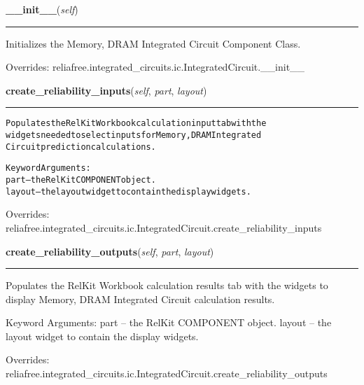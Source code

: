 \hspace{.8\funcindent}\begin{boxedminipage}{\funcwidth}

    \raggedright \textbf{\_\_init\_\_}(\textit{self})

    \vspace{-1.5ex}

    \rule{\textwidth}{0.5\fboxrule}
\setlength{\parskip}{2ex}
    Initializes the Memory, DRAM Integrated Circuit Component Class.

\setlength{\parskip}{1ex}
      Overrides: reliafree.integrated\_circuits.ic.IntegratedCircuit.\_\_init\_\_

    \end{boxedminipage}

    \vspace{0.5ex}

\hspace{.8\funcindent}\begin{boxedminipage}{\funcwidth}

    \raggedright \textbf{create\_reliability\_inputs}(\textit{self}, \textit{part}, \textit{layout})

    \vspace{-1.5ex}

    \rule{\textwidth}{0.5\fboxrule}
\setlength{\parskip}{2ex}
\begin{alltt}
Populates the RelKit Workbook calculation input tab with the
widgets needed to select inputs for Memory, DRAM Integrated
Circuit prediction calculations.

Keyword Arguments:
  part -- the RelKit COMPONENT object.
layout -- the layout widget to contain the display widgets.
\end{alltt}

\setlength{\parskip}{1ex}
      Overrides: reliafree.integrated\_circuits.ic.IntegratedCircuit.create\_reliability\_inputs

    \end{boxedminipage}

    \vspace{0.5ex}

\hspace{.8\funcindent}\begin{boxedminipage}{\funcwidth}

    \raggedright \textbf{create\_reliability\_outputs}(\textit{self}, \textit{part}, \textit{layout})

    \vspace{-1.5ex}

    \rule{\textwidth}{0.5\fboxrule}
\setlength{\parskip}{2ex}
    Populates the RelKit Workbook calculation results tab with the 
    widgets to display Memory, DRAM Integrated Circuit calculation results.

    Keyword Arguments: part   -- the RelKit COMPONENT object. layout -- 
    the layout widget to contain the display widgets.

\setlength{\parskip}{1ex}
      Overrides: reliafree.integrated\_circuits.ic.IntegratedCircuit.create\_reliability\_outputs

    \end{boxedminipage}

